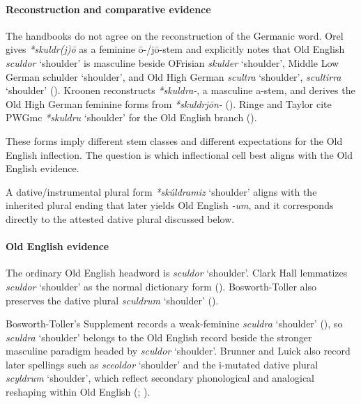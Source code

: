\documentclass[
  british,
  a4paper,
]{article}
\providecommand{\Recon}[1]{\emph{*#1}}
\begin{document}
\paragraph{Reconstruction and comparative
evidence}\label{reconstruction-and-comparative-evidence-141}

The handbooks do not agree on the reconstruction of the Germanic word.
Orel gives \emph{*skuldr(j)ō} as a feminine ō-/jō-stem and explicitly
notes that Old English {\emph{sculdor}} `shoulder' is masculine beside
OFrisian {\emph{skulder}} `shoulder', Middle Low German {schulder}
`shoulder', and Old High German {\emph{scultra}} `shoulder',
{\emph{scultirra}} `shoulder' ().
Kroonen reconstructs {\emph{*skuldra-}}, a masculine a-stem, and derives
the Old High German feminine forms from {\emph{*skuldrjōn-}}
(). Ringe and Taylor cite
PWGmc \Recon{skuldru} `shoulder' for the Old English branch
().

These forms imply different stem classes and different expectations for
the Old English inflection. The question is which inflectional cell best
aligns with the Old English evidence.

A dative/instrumental plural form \Recon{skúldramiz} `shoulder' aligns
with the inherited plural ending that later yields Old English
\emph{-um}, and it corresponds directly to the attested dative plural
discussed below.

\paragraph{Old English evidence}\label{old-english-evidence-143}

The ordinary Old English headword is {\emph{sculdor}} `shoulder'. Clark
Hall lemmatizes {\emph{sculdor}} `shoulder' as the normal dictionary
form ().
Bosworth-Toller also preserves the dative plural {\emph{sculdrum}}
`shoulder' ().

Bosworth-Toller's Supplement records a weak-feminine {\emph{sculdra}}
`shoulder' (), so {\emph{sculdra}} `shoulder' belongs to the Old English record
beside the stronger masculine paradigm headed by {\emph{sculdor}}
`shoulder'. Brunner and Luick also record later spellings such as
{\emph{sceoldor}} `shoulder' and the i-mutated dative plural
{\emph{scyldrum}} `shoulder', which reflect secondary phonological and
analogical reshaping within Old English
(;
).
\end{document}
